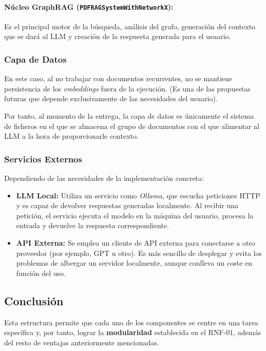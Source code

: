 \paragraph{Núcleo GraphRAG (\texttt{PDFRAGSystemWithNetworkX}):}
Es el principal motor de la búsqueda, análisis del grafo, generación del contexto que se dará al LLM y creación de la respuesta generada para el usuario.

\subsubsection{Capa de Datos}

En este caso, al no trabajar con documentos recurrentes, no se mantiene persistencia de los \textit{embeddings} fuera de la ejecución.
(Es una de las propuestas futuras que depende exclusivamente de las necesidades del usuario).

Por tanto, al momento de la entrega, la capa de datos es únicamente el sistema de ficheros en el que se almacena el grupo de documentos con el que alimentar al LLM a la hora de proporcionarle contexto.

\subsubsection{Servicios Externos}

Dependiendo de las necesidades de la implementación concreta:

\begin{itemize}
    \item \textbf{LLM Local:}
    Utiliza un servicio como \textit{Ollama}, que escucha peticiones HTTP y es capaz de devolver respuestas generadas localmente.
    Al recibir una petición, el servicio ejecuta el modelo en la máquina del usuario, procesa la entrada y devuelve la respuesta correspondiente.

    \item \textbf{API Externa:}
    Se emplea un cliente de API externa para conectarse a otro proveedor (por ejemplo, GPT u otro).
    Es más sencillo de desplegar y evita los problemas de albergar un servidor localmente, aunque conlleva un coste en función del uso.
\end{itemize}

\subsection{Conclusión}

Esta estructura permite que cada uno de los componentes se centre en una tarea específica y, por tanto, lograr la \textbf{modularidad} establecida en el RNF-01, además del resto de ventajas anteriormente mencionadas.


